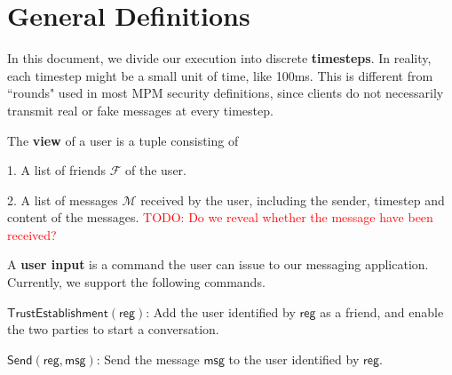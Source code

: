 \documentclass[sigconf, nonacm, balance=false, natbib=false, screen]{acmart}
\newcommand\todo[1]{\textcolor{red}{TODO: #1}}
\newcommand{\msg}{\mathsf{msg}}
\newcommand{\reg}{\mathsf{reg}}
\newcommand{\cF}{\mathcal{F}}
\newcommand{\cM}{\mathcal{M}}
\begin{document}
\section{General Definitions}
\begin{definition}
In this document, we divide our execution into discrete \textbf{timesteps}. In reality, each timestep might be a small unit of time, like 100ms. This is different from ``rounds" used in most MPM security definitions, since clients do not necessarily transmit real or fake messages at every timestep.
\end{definition}
\begin{definition}
The \textbf{view} of a user is a tuple consisting of

1. A list of friends $\cF$ of the user.

2. A list of messages $\cM$ received by the user, including the sender, timestep and content of the messages. \todo{Do we reveal whether the message have been received?}
\end{definition}
\begin{definition}
A \textbf{user input} is a command the user can issue to our messaging application. Currently, we support the following commands.

$\mathsf{TrustEstablishment}(\reg)$: Add the user identified by $\reg$ as a friend, and enable the two parties to start a conversation.

$\mathsf{Send}(\reg, \msg)$: Send the message $\msg$ to the user identified by $\reg$.


\end{definition}
\end{document}
